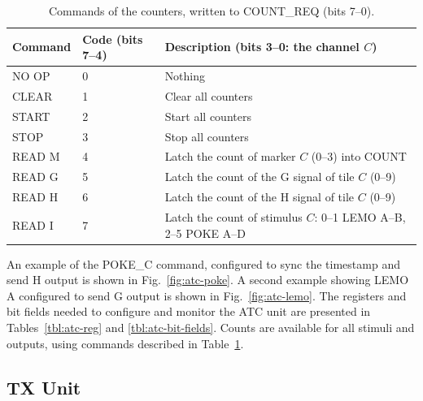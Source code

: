 \documentclass[12pt]{article}
\begin{document}
\begin{table}[htbp]
\caption{\label{tbl:atc-cmd} Commands of the counters, written to COUNT\_REQ (bits 7--0).}
\begin{center}
\begin{tabular}{ll>{\raggedright\arraybackslash}p{11.6cm}}
Command & Code (bits 7--4) & Description (bits 3--0: the channel $C$) \\
\hline
NO OP   & 0 & Nothing \\
CLEAR   & 1 & Clear all counters \\
START   & 2 & Start all counters \\
STOP    & 3 & Stop all counters \\
READ M  & 4 & Latch the count of marker $C$ (0--3) into COUNT \\
READ G  & 5 & Latch the count of the G signal of tile $C$ (0--9) \\
READ H  & 6 & Latch the count of the H signal of tile $C$ (0--9) \\
READ I  & 7 & Latch the count of stimulus $C$: 0--1 LEMO A--B, 2--5 POKE A--D \\
\end{tabular}
\end{center}
\end{table}

An example of the POKE\_C command, configured to sync the timestamp and send H output is shown in Fig.~\ref{fig:atc-poke}.  A second example showing LEMO A configured to send G output is shown in Fig.~\ref{fig:atc-lemo}.
The registers and bit fields needed to configure and monitor the ATC unit are presented in Tables~\ref{tbl:atc-reg} and \ref{tbl:atc-bit-fields}.  Counts are available for all stimuli and outputs, using commands described in Table~\ref{tbl:atc-cmd}.

\subsection{TX Unit}
\end{document}
